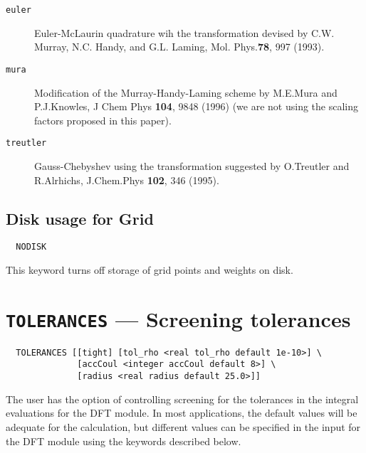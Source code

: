 \begin{description}
\item[\tt euler] Euler-McLaurin quadrature wih the transformation
  devised by
C.W. Murray, N.C. Handy, and G.L. Laming,
Mol. Phys.{\bf 78}, 997 (1993).
 \\
\item[\tt mura] Modification of the Murray-Handy-Laming scheme by 
M.E.Mura and P.J.Knowles, J Chem Phys {\bf 104}, 9848
(1996) (we are not using the scaling factors proposed
in this paper).\\
\item[\tt treutler] Gauss-Chebyshev using the transformation suggested
  by O.Treutler and R.Alrhichs, J.Chem.Phys {\bf 102}, 346 (1995).\\
\end{description}

\subsection{Disk usage for Grid}

\begin{verbatim}
  NODISK
\end{verbatim}

This keyword turns off storage of grid points and weights on disk.


\section{{\tt TOLERANCES} --- Screening tolerances}

\begin{verbatim}
  TOLERANCES [[tight] [tol_rho <real tol_rho default 1e-10>] \
              [accCoul <integer accCoul default 8>] \
              [radius <real radius default 25.0>]]
\end{verbatim}
%
%
The user has the option of controlling screening for the tolerances in
the integral evaluations for the DFT module.  In most applications,
the default values will be adequate for the calculation, but different
values can be specified in the input for the DFT module using the
keywords described below.


